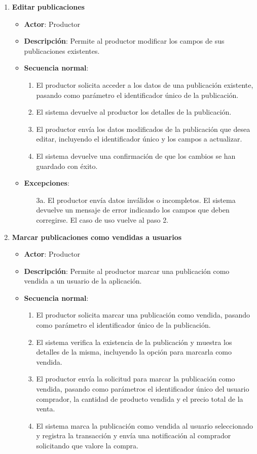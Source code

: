 \begin{enumerate}[label=UC-\protect\twodigits{\arabic*}:, align=left, leftmargin=*]
\item \textbf{Editar publicaciones}
\begin{itemize}
\item \textbf{Actor}: Productor
\item \textbf{Descripción}: Permite al productor modificar los campos de sus publicaciones existentes.
\item \textbf{Secuencia normal}:
\begin{enumerate}[label={\arabic*}:]
\item El productor solicita acceder a los datos de una publicación existente, pasando como parámetro el identificador único de la publicación.
\item El sistema devuelve al productor los detalles de la publicación.
\item El productor envía los datos modificados de la publicación que desea editar, incluyendo el identificador único y los campos a actualizar.
\item El sistema devuelve una confirmación de que los cambios se han guardado con éxito.
\end{enumerate}
\item \textbf{Excepciones}:
\begin{itemize}
\item[3a.] El productor envía datos inválidos o incompletos. El sistema devuelve un mensaje de error indicando los campos que deben corregirse. El caso de uso vuelve al paso 2.
\end{itemize}
\end{itemize}

\item \textbf{Marcar publicaciones como vendidas a usuarios}
\begin{itemize}
\item \textbf{Actor}: Productor
\item \textbf{Descripción}: Permite al productor marcar una publicación como vendida a un usuario de la aplicación.
\item \textbf{Secuencia normal}:
\begin{enumerate}[label={\arabic*}:]
\item El productor solicita marcar una publicación como vendida, pasando como parámetro el identificador único de la publicación.
\item El sistema verifica la existencia de la publicación y muestra los detalles de la misma, incluyendo la opción para marcarla como vendida.
\item El productor envía la solicitud para marcar la publicación como vendida, pasando como parámetros el identificador único del usuario comprador, la cantidad de producto vendida y el precio total de la venta.
\item El sistema marca la publicación como vendida al usuario seleccionado y registra la transacción y envía una notificación al comprador solicitando que valore la compra.
\end{enumerate}
\end{itemize}


\end{enumerate}
